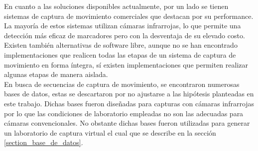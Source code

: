 \hspace*{0.5cm}En cuanto a las soluciones disponibles actualmente, por un lado se tienen sistemas de captura de movimiento comerciales que destacan por su performance. La mayoría de estos sistemas utilizan cámaras infrarrojas, lo que permite una detección más eficaz de marcadores pero con la desventaja de su elevado costo. Existen también alternativas de software libre, aunque no se han encontrado implementaciones que realicen todas las etapas de un sistema de captura de movimiento en forma íntegra, sí existen implementaciones que permiten realizar algunas etapas de manera aislada.\\ %
\hspace*{0.5cm}En busca de secuencias de captura de movimiento, se encontraron numerosas bases de datos, estas se descartaron por no ajustarse a las hipótesis planteadas en este trabajo. Dichas bases fueron diseñadas para capturas con cámaras infrarrojas por lo que las condiciones de laboratorio empleadas no son las adecuadas para cámaras convencionales. No obstante dichas bases fueron utilizadas para generar un laboratorio de captura virtual el cual que se describe en  la sección \ref{section_base_de_datos}.





















